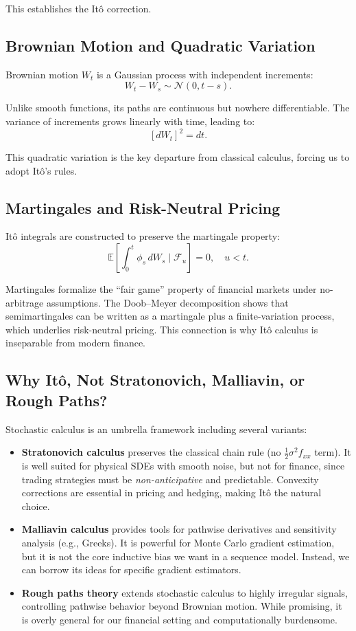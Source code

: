 \documentclass[10pt,twocolumn]{article}
\begin{document}
This establishes the It\^o correction.

\subsection{Brownian Motion and Quadratic Variation}

Brownian motion $W_t$ is a Gaussian process with independent increments:
\[
W_t - W_s \sim \mathcal{N}(0, t-s).
\]

Unlike smooth functions, its paths are continuous but nowhere differentiable. 
The variance of increments grows linearly with time, leading to:
\[
[dW_t]^2 = dt.
\]

This quadratic variation is the key departure from classical calculus, forcing us to adopt It\^o's rules.

\subsection{Martingales and Risk-Neutral Pricing}

It\^o integrals are constructed to preserve the martingale property:
\[
\mathbb{E}\left[\int_0^t \phi_s\, dW_s \mid \mathcal{F}_u\right] = 0, \quad u<t.
\]

Martingales formalize the “fair game” property of financial markets under no-arbitrage assumptions. 
The Doob–Meyer decomposition shows that semimartingales can be written as a martingale plus a finite-variation process, which underlies risk-neutral pricing. 
This connection is why It\^o calculus is inseparable from modern finance.

\subsection{Why It\^o, Not Stratonovich, Malliavin, or Rough Paths?}

Stochastic calculus is an umbrella framework including several variants:

\begin{itemize}
    \item \textbf{Stratonovich calculus} preserves the classical chain rule (no $\tfrac{1}{2}\sigma^2 f_{xx}$ term). It is well suited for physical SDEs with smooth noise, but not for finance, since trading strategies must be \emph{non-anticipative} and predictable. Convexity corrections are essential in pricing and hedging, making It\^o the natural choice.
    \item \textbf{Malliavin calculus} provides tools for pathwise derivatives and sensitivity analysis (e.g., Greeks). It is powerful for Monte Carlo gradient estimation, but it is not the core inductive bias we want in a sequence model. Instead, we can borrow its ideas for specific gradient estimators.
    \item \textbf{Rough paths theory} extends stochastic calculus to highly irregular signals, controlling pathwise behavior beyond Brownian motion. While promising, it is overly general for our financial setting and computationally burdensome.
\end{itemize}
\end{document}
